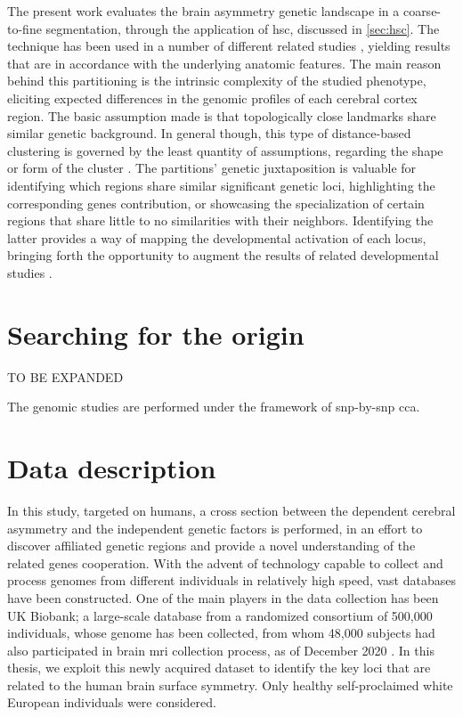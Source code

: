 The present work evaluates the brain asymmetry genetic landscape in a coarse-to-fine segmentation, through the application of \ac{hsc}\cite{Ng2002}, discussed in \autoref{sec:hsc}. The technique has been used in a number of different related studies \cite{Claes2018}\cite{Naqvi2021}, yielding results that are in accordance with the underlying anatomic features. The main reason behind this partitioning is the intrinsic complexity of the studied phenotype, eliciting expected differences in the genomic profiles of each cerebral cortex region. The basic assumption made is that topologically close landmarks share similar genetic background. In general though, this type of distance-based clustering is governed by the least quantity of assumptions, regarding the shape or form of the cluster \cite{VonLuxburg2007}. The partitions' genetic juxtaposition is valuable for identifying which regions share similar significant genetic loci, highlighting the corresponding genes contribution, or showcasing the specialization of certain regions that share little to no similarities with their neighbors. Identifying the latter provides a way of mapping the developmental activation of each locus, bringing forth the opportunity to augment the results of related developmental studies \cite{Vijayakumar2016}.

\section{Searching for the origin}
TO BE EXPANDED

The genomic studies are performed under the framework of \ac{snp}-by-\ac{snp} \ac{cca}. 


\section{Data description}
In this study, targeted on humans, a cross section between the dependent cerebral asymmetry and the independent genetic factors is performed, in an effort to discover affiliated genetic regions and provide a novel understanding of the related genes cooperation. With the advent of technology capable to collect and process genomes from different individuals in relatively high speed, vast databases have been constructed. One of the main players in the data collection has been UK Biobank; a large-scale database from a randomized consortium of 500,000 individuals, whose genome has been collected, from whom  48,000 subjects had also participated in brain \ac{mri} collection process, as of December 2020 \cite{Littlejohns2020}. In this thesis, we exploit this newly acquired dataset to identify the key loci that are related to the human brain surface symmetry. Only healthy self-proclaimed white European individuals were considered. 

